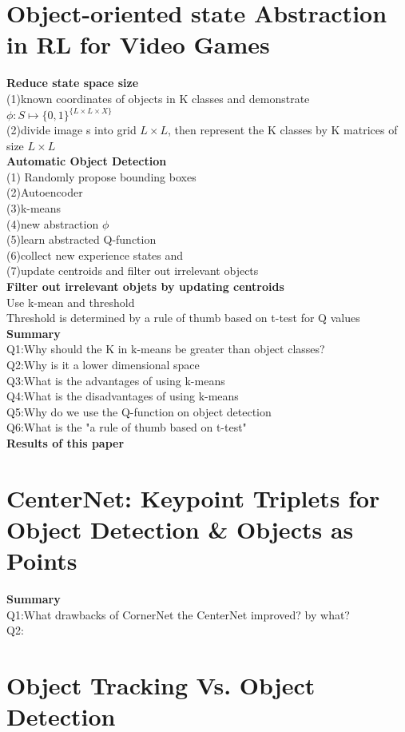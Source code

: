 \section{Object-oriented state Abstraction in RL for Video Games}
\textbf{Reduce state space size}\\
(1)known coordinates of objects in K classes and demonstrate $\phi :S\mapsto \{0,1\} ^{\{L\times L\times X\}}$\\
(2)divide image s into grid $L\times L$, then represent the K classes by K matrices of size $L\times L$\\
\textbf{Automatic Object Detection}\\
(1) Randomly propose bounding boxes\\
(2)Autoencoder\\
(3)k-means\\
(4)new abstraction $\phi$\\
(5)learn abstracted Q-function\\
(6)collect new experience states and\\
(7)update centroids and filter out irrelevant objects\\
\textbf{Filter out irrelevant objets by updating centroids}\\
Use k-mean and threshold\\
Threshold is determined by a rule of thumb based on t-test for Q values
\textbf{Summary}\\
Q1:Why should the K in k-means be greater than object classes?\\
Q2:Why is it a lower dimensional space\\
Q3:What is the advantages of using k-means\\
Q4:What is the disadvantages of using k-means\\
Q5:Why do we use the Q-function on object detection\\
Q6:What is the "a rule of thumb based on t-test"\\
\textbf{Results of this paper}\\

\section{CenterNet: Keypoint Triplets for Object Detection & Objects as Points}
\textbf{Summary}\\
Q1:What drawbacks of CornerNet the CenterNet improved? by what?\\
Q2:

\section{Object Tracking Vs. Object Detection}